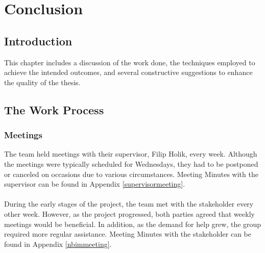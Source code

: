 \newpage
\thispagestyle{empty}
\mbox{}

\chapter{Conclusion}
\section{Introduction}
This chapter includes a discussion of the work done, the techniques employed to achieve the intended outcomes, and several constructive suggestions to enhance the quality of the thesis.

\section{The Work Process}

\subsection{Meetings}
The team held meetings with their supervisor, Filip Holik, every week. Although the meetings were typically scheduled for Wednesdays, they had to be postponed or canceled on occasions due to various circumstances. Meeting Minutes with the supervisor can be found in Appendix \ref{supervisormeeting}.
\\~\\
During the early stages of the project, the team met with the stakeholder every other week. However, as the project progressed, both parties agreed that weekly meetings would be beneficial. In addition, as the demand for help grew, the group required more regular assistance. Meeting Minutes with the stakeholder can be found in Appendix \ref{nbimmeeting}.

